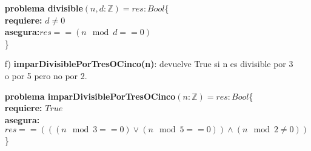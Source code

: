 \documentclass[10pt,a4paper]{article}
\begin{document}
\begin{enumerate}
\textbf{problema divisible}$(n,d : \mathbb{Z})=res:Bool$\{ \\
	\textbf{  requiere:} $d\not = 0$\\
	\textbf{  asegura:}$res == (n \mod d==0)$\\
	\}

\item[f)]\textbf{imparDivisiblePorTresOCinco(n)}: devuelve True si n es divisible por 3 o por 5 pero no por 2.

\textbf{problema imparDivisiblePorTresOCinco}$(n : \mathbb{Z})=res:Bool$\{ \\
	\textbf{  requiere:} $True$\\
	\textbf{  asegura:}$res == (((n \mod 3==0)\vee (n \mod 5==0)) \wedge (n \mod 2 \not = 0))$\\
	\}

\end{enumerate}
\end{document}
